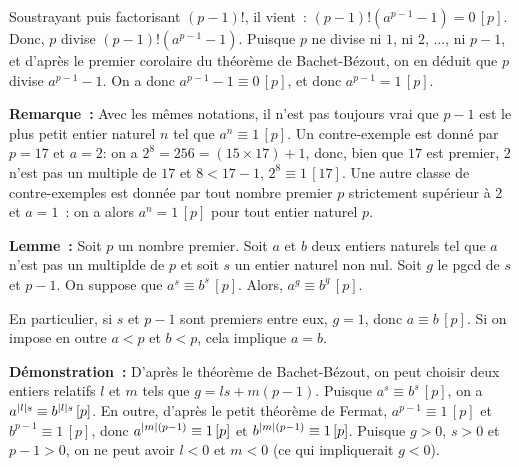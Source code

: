 Soustrayant puis factorisant $(p-1)!$, il vient : $(p-1)! \left( a^{p-1} - 1 \right) = 0 \, [p]$. 
Donc, $p$ divise $(p-1)! \left( a^{p-1} - 1 \right)$. 
Puisque $p$ ne divise ni $1$, ni $2$, ..., ni $p-1$, et d'après le premier corolaire du théorème de Bachet-Bézout, on en déduit que $p$ divise $a^{p-1} - 1$. 
On a donc $a^{p-1} - 1 \equiv 0 \, [p]$, et donc $a^{p-1} = 1 \, [p]$.

\done

\medskip

\noindent\textbf{Remarque :} Avec les mêmes notations, il n'est pas toujours vrai que $p-1$ est le plus petit entier naturel $n$ tel que $a^n \equiv 1 \, [p]$.
    Un contre-exemple est donné par $p = 17$ et $a = 2$: on a $2^8 = 256 = (15 \times 17) + 1$, donc, bien que $17$ est premier, $2$ n'est pas un multiple de $17$ et $8 < 17 - 1$, $2^8 \equiv 1 \, [17]$. 
    Une autre classe de contre-exemples est donnée par tout nombre premier $p$ strictement supérieur à $2$ et $a = 1$ : on a alors $a^n = 1 \, [p]$ pour tout entier naturel $p$.

\medskip

\noindent\textbf{Lemme :} Soit $p$ un nombre premier. 
    Soit $a$ et $b$ deux entiers naturels tel que $a$ n'est pas un multiplde de $p$ et soit $s$ un entier naturel non nul.
    Soit $g$ le pgcd de $s$ et $p-1$.
    On suppose que $a^s \equiv b^s \, [p]$.
    Alors, $a^g \equiv b^g \, [p]$.
    
    \noindent En particulier, si $s$ et $p-1$ sont premiers entre eux, $g = 1$, donc $a \equiv b \, [p]$.
    Si on impose en outre $a < p$ et $b < p$, cela implique $a = b$.

\medskip

\noindent\textbf{Démonstration :} 
D'après le théorème de Bachet-Bézout, on peut choisir deux entiers relatifs $l$ et $m$ tels que $g = l s + m (p-1)$. 
Puisque $a^s \equiv b^s \, [p]$, on a $a^{\left\lvert l \right\rvert s} \equiv b^{\left\lvert l \right\rvert s} \, [p]$.
En outre, d'après le petit théorème de Fermat, $a^{p-1} \equiv 1 \, [p]$ et $b^{p-1} \equiv 1 \, [p]$, donc $a^{\left\lvert m \right\rvert (p-1)} \equiv 1 \, [p]$ et $b^{\left\lvert m \right\rvert (p-1)} \equiv 1 \, [p]$.
Puisque $g > 0$, $s > 0$ et $p-1 > 0$, on ne peut avoir $l < 0$ et $m < 0$ (ce qui impliquerait $g < 0$).

